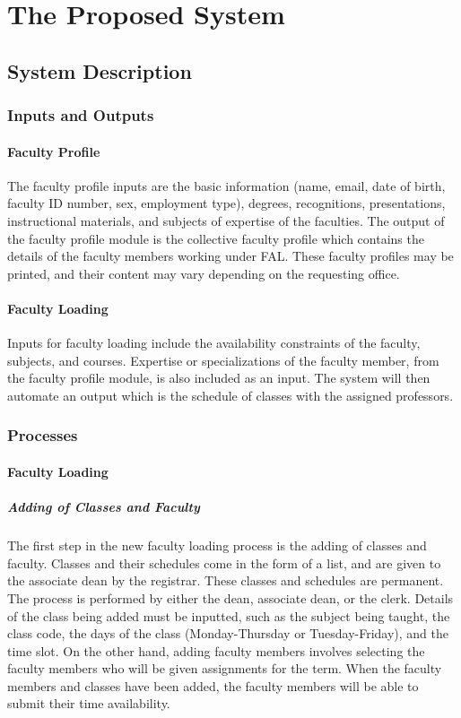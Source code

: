 \chapter{The Proposed System}

\section{System Description}

\subsection{Inputs and Outputs}

\subsubsection{Faculty Profile}
The faculty profile inputs are the basic information (name, email, date of birth, faculty ID number, sex, employment type), degrees, recognitions, presentations, instructional materials, and subjects of expertise of the faculties. The output of the faculty profile module is the collective faculty profile which contains the details of the faculty members working under FAL. These faculty profiles may be printed, and their content may vary depending on the requesting office.

\subsubsection{Faculty Loading}
Inputs for faculty loading include the availability constraints of the faculty, subjects, and courses. Expertise or specializations of the faculty member, from the faculty profile module, is also included as an input. The system will then automate an output which is the schedule of classes with the assigned professors.

\subsection{Processes}

    \subsubsection{Faculty Loading}
        \paragraph{Adding of Classes and Faculty}
        The first step in the new faculty loading process is the adding of classes and faculty. Classes and their schedules come in the form of a list, and are given to the associate dean by the registrar. These classes and schedules are permanent. The process is performed by either the dean, associate dean, or the clerk. Details of the class being added must be inputted, such as the subject being taught, the class code, the days of the class (Monday-Thursday or Tuesday-Friday), and the time slot. On the other hand, adding faculty members involves selecting the faculty members who will be given assignments for the term. When the faculty members and classes have been added, the faculty members will be able to submit their time availability.
        

